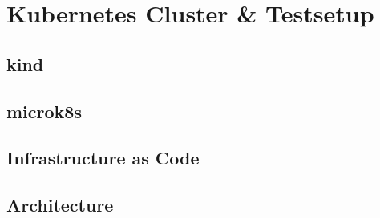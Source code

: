 \chapter{Kubernetes Cluster \& Testsetup}
\label{ch:cluster_testsetup}

\section{kind}
\label{sec:kind}

\section{microk8s}
\label{sec:microk8s}

\section{Infrastructure as Code}
\label{sec:iac}

\section{Architecture}
\label{sec:architecture}

